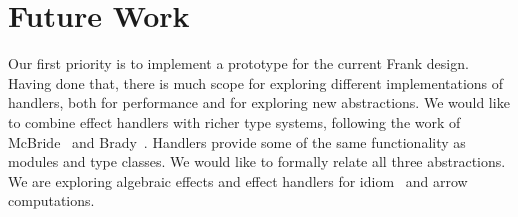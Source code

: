 \section{Future Work}
\label{sec:future}

Our first priority is to implement a prototype for the current Frank
design. Having done that, there is much scope for exploring different
implementations of handlers, both for performance and for exploring
new abstractions.
%
We would like to combine effect handlers with richer type systems,
following the work of McBride~\cite{McBride11} and
Brady~\cite{Brady13}.
%
Handlers provide some of the same functionality as modules and type
classes. We would like to formally relate all three abstractions.
%
We are exploring algebraic effects and effect handlers for
idiom~\cite{McbrideP08} and arrow~\cite{Hughes04} computations.


